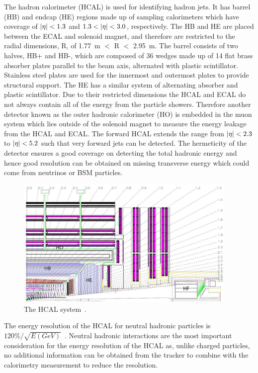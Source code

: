 The hadron calorimeter (HCAL) is used for identifying hadron jets. It has barrel (HB) and endcap (HE) regions made up of sampling calorimeters which have coverage of $\lvert \eta \rvert<1.3$ and $1.3<\lvert \eta \rvert<3.0$, respectively. The HB and HE are placed between the ECAL and solenoid magnet, and therefore are restricted to the radial dimensions, R, of 1.77~m $<$ R $<$ 2.95~m. The barrel consists of two halves, HB+ and HB-, which are composed of 36 wedges made up of 14 flat brass absorber plates parallel to the beam axis, alternated with plastic scintillator. Stainless steel plates are used for the innermost and outermost plates to provide structural support. The HE has a similar system of alternating absorber and plastic scintillator.
Due to their restricted dimensions the HCAL and ECAL do not always contain all of the energy from the particle showers. Therefore another detector known as the outer hadronic calorimeter (HO) is embedded in the muon system which lies outside of the solenoid magnet to measure the energy leakage from the HCAL and ECAL.
The forward HCAL extends the range from $\lvert \eta \rvert<2.3$ to $\lvert \eta \rvert<5.2$ such that very forward jets can be detected. The hermeticity of the detector ensures a good coverage on detecting the total hadronic energy and hence good resolution can be obtained on missing transverse energy which could come from neutrinos or BSM particles.

\begin{figure}[ht!]
\centering
    \includegraphics[width=0.95\textwidth]{images/HCAL.png}
    \caption{The HCAL system~\cite{Isildak:2013kfa}.}
    \label{fig:hcal}
\end{figure}

The energy resolution of the HCAL for neutral hadronic particles is $120\%/\sqrt{E (GeV)}$~\cite{Beaudette:2014cea}. Neutral hadronic interactions are the most important consideration for the energy resolution of the HCAL as, unlike charged particles, no additional information can be obtained from the tracker to combine with the calorimetry measurement to reduce the resolution.


